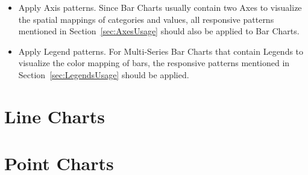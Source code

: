 \begin{itemize}
\item
Apply Axis patterns.
Since Bar Charts usually contain two Axes to visualize the spatial mappings of categories and values, all responsive patterns mentioned in Section~\ref{sec:AxesUsage} should also be applied to Bar Charts.

\item
Apply Legend patterns.
For Multi-Series Bar Charts that contain Legends to visualize the color mapping of bars, the responsive patterns mentioned in Section~\ref{sec:LegendsUsage} should be applied.

\end{itemize}

\section{Line Charts}
\label{sec:LineChartsUsage}

\section{Point Charts}
\label{sec:PointChartsUsage}
